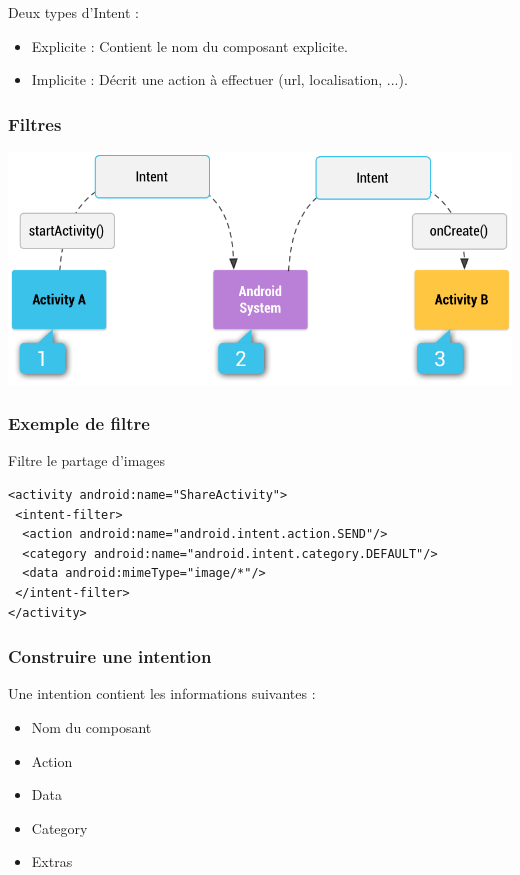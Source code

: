 \documentclass{beamer}
\begin{document}
\begin{frame}
\begin{block}{Deux types d'Intent :}
\begin{itemize}
\item Explicite : Contient le nom du composant explicite.
\item Implicite : Décrit une action à effectuer (url, localisation, ...).
\end{itemize}

\end{block}
\end{frame}

\begin{frame}
\frametitle{Filtres}
\begin{center}
\includegraphics[scale=0.3]{intent-filters2.png}
\end{center}
\end{frame}

\begin{frame}[fragile]
\frametitle{Exemple de filtre}
\begin{block}{Filtre le partage d'images}
\lstset{language=XML}
\begin{lstlisting}
<activity android:name="ShareActivity">
 <intent-filter>
  <action android:name="android.intent.action.SEND"/>
  <category android:name="android.intent.category.DEFAULT"/>
  <data android:mimeType="image/*"/>
 </intent-filter>
</activity>
\end{lstlisting}
\end{block}
\end{frame}

\begin{frame}
\frametitle{Construire une intention}
\begin{block}{Une intention contient les informations suivantes :}
\begin{itemize}
\item Nom du composant
\item Action
\item Data
\item Category
\item Extras
\end{itemize}
\end{block}
\end{frame}
\end{document}
